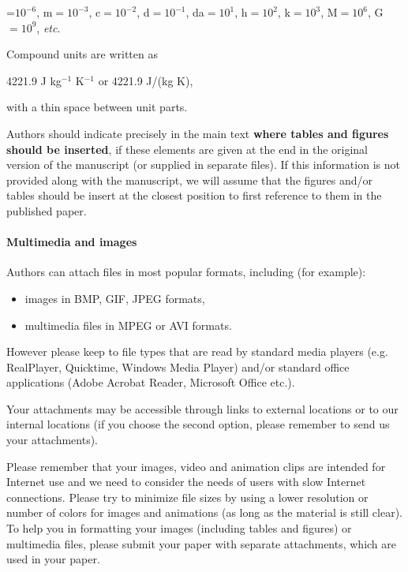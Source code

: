 \documentclass[USenglish,oneside,twocolumn]{article}
\begin{document}
\begin{center}
    \textmu=$10^{-6}$, m$=10^{-3}$, c$=10^{-2}$, d$=10^{-1}$,
    da$=10^1$, h$=10^2$, k$=10^3$, M$=10^6$, G$=10^9$, {\em etc}.
\end{center}

    Compound units are written as
\begin{center}
    4221.9 J kg$^{-1}$ K$^{-1}$ or 4221.9 J/(kg K),
\end{center}
    with a thin space between unit parts.


    Authors should indicate precisely in the main text {\bf where tables and figures should be inserted}, if these elements are given at the end in the original version of the manuscript (or supplied in separate files).
    If this information is not provided along with the manuscript, we will assume that the figures and/or tables should be insert at the closest position to first reference to them in the published paper.

\paragraph{Multimedia and images}
    Authors can attach files in most popular formats, including (for example):
\begin{itemize}
\item images in BMP, GIF, JPEG formats,
\item multimedia files in MPEG or AVI formats.
\end{itemize}

However please keep to file types that are read by standard media players (e.g. RealPlayer, Quicktime, Windows Media Player) and/or standard office applications (Adobe Acrobat Reader, Microsoft Office etc.).

    Your attachments may be accessible through links to external locations or to our internal locations (if you choose the second option, please remember to send us your attachments).

    Please remember that your images, video and animation clips are intended for Internet use and we need to consider the needs of users with slow Internet connections. Please try to minimize file sizes by using a lower resolution or number of colors for images and animations (as long as the material is still clear). To help you in formatting your images (including tables and figures) or multimedia files, please submit your paper with separate attachments, which are used in your paper.
\end{document}
